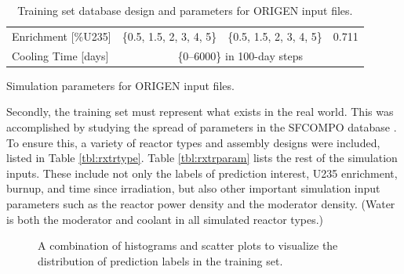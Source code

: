 \begin{table}[!htb]
\begin{subtable}{\linewidth}
\begin{tabular}{@{}llll@{}}
      Enrichment [\%\gls{U235}]& \{0.5, 1.5, 2, 3, 4, 5\}         & \{0.5, 1.5, 2, 3, 4, 5\}         & 0.711         \\
      Cooling Time [days]      & \multicolumn{3}{c}{\{0--6000\} in 100-day steps}                                    \\ \bottomrule
    \end{tabular}
    \caption{Simulation parameters for \gls{ORIGEN} input files.}
    \label{tbl:rxtrparam}
  \end{subtable}%
  \caption{Training set database design and parameters for \gls{ORIGEN} input files.}
  \label{tbl:train}
\end{table}

Secondly, the training set must represent what exists in the real world. This
was accomplished by studying the spread of parameters in the \gls{SFCOMPO}
database \cite{sfcompo, valid_sfco}.  To ensure this, a variety of reactor
types and assembly designs were included, listed in Table \ref{tbl:rxtrtype}.
Table \ref{tbl:rxtrparam} lists the rest of the simulation inputs. These
include not only the labels of prediction interest, \gls{U235} enrichment,
burnup, and time since irradiation, but also other important simulation input
parameters such as the reactor power density and the moderator density.  (Water
is both the moderator and coolant in all simulated reactor types.)

\begin{figure}[!hbt]
  \caption{A combination of histograms and scatter plots to visualize the 
           distribution of prediction labels in the training set.}
  \label{fig:trainhist}
\end{figure}

